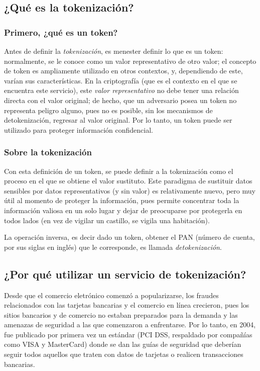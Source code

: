 %
%

\subsection{¿Qué es la tokenización?}

\subsubsection{Primero, ¿qué es un token?}

Antes de definir la \textit{tokenización}, es menester definir lo que es
un token: normalmente, se le conoce como un valor representativo de otro
valor; el concepto de token es ampliamente utilizado en otros contextos,
y, dependiendo de este, varían sus características. En la criptografía
(que es el contexto en el que se encuentra este servicio), este
\textit{valor representativo} no debe tener una relación directa con el
valor original; de hecho, que un adversario posea un token no representa
peligro alguno, pues no es posible, sin los mecanismos de
detokenización, regresar al valor original. Por lo tanto, un token puede
ser utilizado para proteger información confidencial.

\subsubsection{Sobre la tokenización}

Con esta definición de un token, se puede definir a la tokenización como
el proceso en el que se obtiene el valor sustituto. Este paradigma de
sustituir datos sensibles por datos representativos (y sin valor) es
relativamente nuevo, pero muy útil al momento de proteger la
información, pues permite concentrar toda la información valiosa en un
solo lugar y dejar de preocuparse por protegerla en todos lados (en vez
de vigilar un castillo, se vigila una habitación).

La operación inversa, es decir dado un token, obtener el PAN (número de
cuenta, por sus siglas en inglés) que le corresponde, es llamada
\textit{detokenización}.

\subsection{¿Por qué utilizar un servicio de tokenización?}

Desde que el comercio eletrónico comenzó a popularizarse, los fraudes
relacionados con las tarjetas bancarias y el comercio en línea
crecieron, pues los sitios bancarios y de comercio no estaban
preparados para la demanda y las amenazas de seguridad a las que
comenzaron a enfrentarse. Por lo tanto, en 2004, fue publicado por
primera vez un estándar (PCI DSS, respaldado por compañías como VISA y
MasterCard) donde se dan las guías de seguridad que deberían seguir
todos aquellos que traten con datos de tarjetas o realicen transacciones
bancarias.

